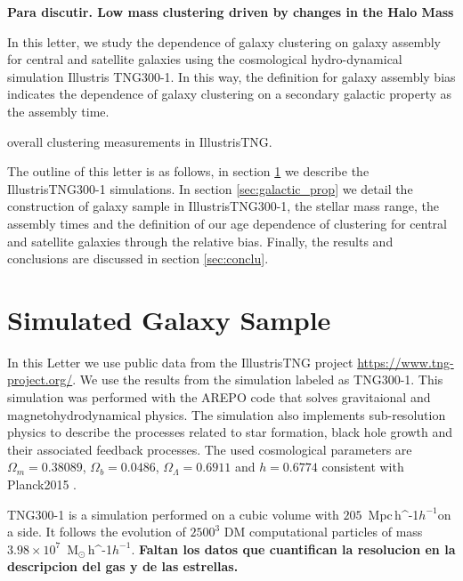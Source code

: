 \documentclass[fleqn,usenatbib]{mnras}
\newcommand{\Msunh}{\,{\rm M}$_{\odot}$\,\ifmmode h^{-1}\else $h^{-1}$\fi}
\newcommand{\Mpch}{\,{\rm Mpc}\,\ifmmode h^{-1}\else $h^{-1}$\fi}
\begin{document}
\textbf{Para discutir. Low mass clustering driven by changes in the Halo Mass}

In this letter, we study the dependence of galaxy
clustering on galaxy assembly for central and satellite galaxies using
the cosmological hydro-dynamical simulation Illustris TNG300-1. In
this way, the definition for galaxy assembly bias indicates the
dependence of galaxy clustering on a secondary galactic property as
the assembly time. 

\citep{2018MNRAS.475..676S} overall clustering measurements in
IllustrisTNG. 

The outline of this letter is as follows, in section \ref{sec:simul}
we describe the IllustrisTNG300-1 simulations. In section
\ref{sec:galactic_prop} we detail the construction of galaxy sample in
IllustrisTNG300-1, the stellar mass range, the assembly times and the
definition of our age dependence of clustering for central and
satellite galaxies through the relative bias. Finally, the results and
conclusions are discussed in section \ref{sec:conclu}. 


\section{Simulated Galaxy Sample}
\label{sec:simul} %

In this Letter we use public data from the IllustrisTNG project
\url{https://www.tng-project.org/}. 
We use the results from the simulation labeled as TNG300-1.
This simulation was performed with the AREPO code
\citep{2018MNRAS.473.4077P} that solves gravitaional and
magnetohydrodynamical physics.
The simulation also implements sub-resolution physics to describe the
processes related to star formation, black hole growth and their
associated feedback processes.
The used cosmological parameters are $\Omega_m=0.38089$,
$\Omega_b=0.0486$, $\Omega_\Lambda= 0.6911$ and $h=0.6774$ consistent
with Planck2015 \citep{2016A&A...594A..13P}. 

TNG300-1 is a simulation performed on a cubic volume
with  $205$ \Mpch on a side.
It follows the evolution of $2500^3$ DM computational particles of
mass $3.98 \times 10^7$ \Msunh. 
\textbf{Faltan los datos que cuantifican la resolucion en la
  descripcion del gas y de las estrellas.}
\end{document}
